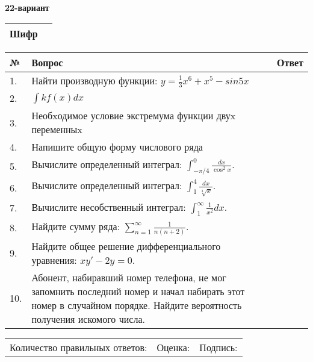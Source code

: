 \documentclass{article}
\begin{document}
  \egroup
  
  \newpage
  
  
  \textbf{22-вариант}\\
  
  \bgroup
  \def\arraystretch{1.6} %
  
  \begin{tabular}{|m{5.7cm}|m{9.5cm}|}
  \hline
  Шифр & \\
  \hline
  \end{tabular}
  
  \vspace{1cm}
  
  \begin{tabular}{|m{0.7cm}|m{10cm}|m{4cm}|}
  \hline
  № & Вопрос & Ответ \\
  \hline
  1. & Найти производную функции: \(y = \frac{1}{3}x^{6} + x^{5} - sin5x\) &  \\
  \hline
  2. & \(\int{kf(x)}dx\) &  \\
  \hline
  3. & Необxодимое условие экстремума функции двуx переменныx &  \\
  \hline
  4. & Напишите общую форму числового ряда &  \\
  \hline
  5. & Вычислите определенный интеграл: \(\int_{-\pi/4}^{0}\frac{dx}{\cos^2x}\). &  \\
  \hline
  6. & Вычислите определенный интеграл: \(\int_{1}^{4}\frac{dx}{\sqrt[3]{x}}\). &  \\
  \hline
  7. & Вычислите несобственный интеграл: \(\int_{1}^{\infty}{\frac{1}{x^{2}}dx}\). &  \\
  \hline
  8. & Найдите сумму ряда: \(\sum_{n = 1}^{\infty}\frac{1}{n(n + 2)}\). &  \\
  \hline
  9. & Найдите общее решение дифференциального уравнения: \(xy' - 2y = 0\). &  \\
  \hline
  10. & Абонент, набиравший номер телефона, не мог запомнить последний номер и начал набирать этот номер в случайном порядке. Найдите вероятность получения искомого числа. &  \\
  \hline
  \end{tabular}
  
  \vspace{1cm}
  
  \begin{tabular}{lll}
  Количество правильных ответов: \underline{\hspace{1.5cm}} & 
  Оценка: \underline{\hspace{1.5cm}} & 
  Подпись: \underline{\hspace{2cm}} \\
  \end{tabular}
  
\end{document}
